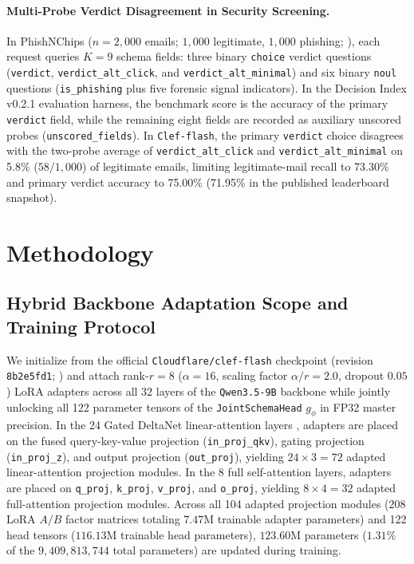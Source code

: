 \documentclass[10pt,twocolumn]{article}
\begin{document}
\paragraph{Multi-Probe Verdict Disagreement in Security Screening.}
In PhishNChips ($n = 2{,}000$ emails; $1{,}000$ legitimate, $1{,}000$ phishing; \citealp{anisselbd2026phishnchips}), each request queries $K = 9$ schema fields: three binary \texttt{choice} verdict questions (\texttt{verdict}, \texttt{verdict\_alt\_click}, and \texttt{verdict\_alt\_minimal}) and six binary \texttt{noul} questions (\texttt{is\_phishing} plus five forensic signal indicators). In the Decision Index v0.2.1 evaluation harness, the benchmark score is the accuracy of the primary \texttt{verdict} field, while the remaining eight fields are recorded as auxiliary unscored probes (\texttt{unscored\_fields}). In \texttt{Clef-flash}, the primary \texttt{verdict} choice disagrees with the two-probe average of \texttt{verdict\_alt\_click} and \texttt{verdict\_alt\_minimal} on 5.8\% ($58/1{,}000$) of legitimate emails, limiting legitimate-mail recall to 73.30\% and primary verdict accuracy to 75.00\% (71.95\% in the published leaderboard snapshot).

\section{Methodology}
\label{sec:method}

\subsection{Hybrid Backbone Adaptation Scope and Training Protocol}
We initialize from the official \texttt{Cloudflare/clef-flash} checkpoint (revision \texttt{8b2e5fd1}; \citealp{cloudflare2026clef}) and attach rank-$r = 8$ ($\alpha = 16$, scaling factor $\alpha / r = 2.0$, dropout $0.05$) LoRA adapters \citep{hu2022lora} across all 32 layers of the \texttt{Qwen3.5-9B} backbone while jointly unlocking all 122 parameter tensors of the \texttt{JointSchemaHead} $g_\phi$ in FP32 master precision. In the 24 Gated DeltaNet linear-attention layers \citep{yang2025gateddeltanet}, adapters are placed on the fused query-key-value projection (\texttt{in\_proj\_qkv}), gating projection (\texttt{in\_proj\_z}), and output projection (\texttt{out\_proj}), yielding $24 \times 3 = 72$ adapted linear-attention projection modules. In the 8 full self-attention layers, adapters are placed on \texttt{q\_proj}, \texttt{k\_proj}, \texttt{v\_proj}, and \texttt{o\_proj}, yielding $8 \times 4 = 32$ adapted full-attention projection modules. Across all 104 adapted projection modules ($208$ LoRA $A/B$ factor matrices totaling $7.47\text{M}$ trainable adapter parameters) and 122 head tensors ($116.13\text{M}$ trainable head parameters), $123.60\text{M}$ parameters ($1.31\%$ of the $9{,}409{,}813{,}744$ total parameters) are updated during training.
\end{document}
